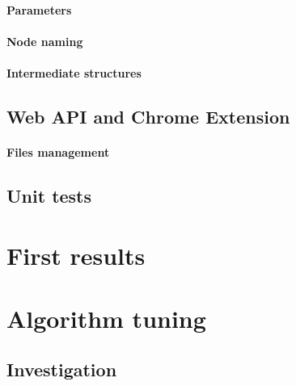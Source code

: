 \documentclass[11pt]{article}
\begin{document}
\paragraph{Parameters}

\paragraph{Node naming}



\paragraph{Intermediate structures}

\subsection{Web API and Chrome Extension}

\paragraph{Files management}

\subsection{Unit tests}

\section{First results}




\section{Algorithm tuning}

\subsection{Investigation}
\end{document}
